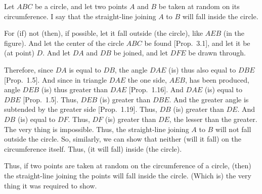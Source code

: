 \begin{Parallel}{}{}
{Let $ABC$ be a circle, and let two points $A$ and $B$ be taken
at random on its circumference. I say that the straight-line joining
$A$ to $B$ will fall inside the circle.

For (if) not (then), if possible, let it fall outside (the circle), like $AEB$ (in the figure). And let the center of the circle $ABC$ be found [Prop.~3.1], and let it be (at point) $D$. And let $DA$ and $DB$ be joined, and let $DFE$ be
drawn through.

Therefore, since $DA$ is equal to $DB$, the angle $DAE$ (is) thus also equal to
$DBE$ [Prop.~1.5]. And since in triangle $DAE$ the one side, $AEB$, has been
produced, angle $DEB$ (is) thus greater than $DAE$ [Prop.~1.16]. And
$DAE$ (is) equal to $DBE$ [Prop.~1.5]. Thus, $DEB$ (is) greater than $DBE$.
And the greater angle is subtended by the greater side [Prop.~1.19].
Thus, $DB$ (is) greater than $DE$. And $DB$ (is) equal to $DF$. Thus,
$DF$ (is) greater than $DE$, the lesser than the greater. The very thing is impossible.
Thus, the straight-line joining $A$ to $B$ will not fall outside the
circle. So, similarly, we can show that neither (will it fall) on the
circumference itself. Thus, (it will fall) inside (the circle).

\epsfysize=2.2in
\centerline{}

Thus, if two points are taken at random on the circumference of a circle, (then)
the straight-line joining the points will fall inside the circle. (Which is) the
very thing it was required to show.}
\end{Parallel}

